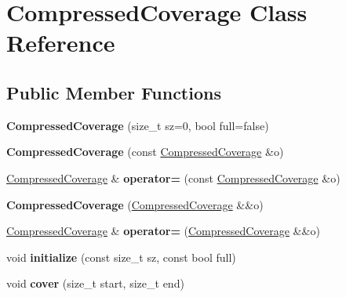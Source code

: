 \hypertarget{classCompressedCoverage}{}\section{Compressed\+Coverage Class Reference}
\label{classCompressedCoverage}
\subsection*{Public Member Functions}
\begin{DoxyCompactItemize}
\item 
\mbox{\label{classCompressedCoverage_afecf6c8baa0069c95fd66ad0b768f536}} 
{\bfseries Compressed\+Coverage} (size\+\_\+t sz=0, bool full=false)
\item 
\mbox{\label{classCompressedCoverage_afc3aafc52e7c0563995eab394e62b876}} 
{\bfseries Compressed\+Coverage} (const \hyperlink{classCompressedCoverage}{Compressed\+Coverage} \&o)
\item 
\mbox{\label{classCompressedCoverage_a6c06a049a069676dcb6a17662ec73bc7}} 
\hyperlink{classCompressedCoverage}{Compressed\+Coverage} \& {\bfseries operator=} (const \hyperlink{classCompressedCoverage}{Compressed\+Coverage} \&o)
\item 
\mbox{\label{classCompressedCoverage_ac91a83632f8c01ce949182532b38093f}} 
{\bfseries Compressed\+Coverage} (\hyperlink{classCompressedCoverage}{Compressed\+Coverage} \&\&o)
\item 
\mbox{\label{classCompressedCoverage_ab4e6bd2cefd62d415fc7ce65010d0830}} 
\hyperlink{classCompressedCoverage}{Compressed\+Coverage} \& {\bfseries operator=} (\hyperlink{classCompressedCoverage}{Compressed\+Coverage} \&\&o)
\item 
\mbox{\label{classCompressedCoverage_ab91db25bdcd5994fa2f5acef3befa987}} 
void {\bfseries initialize} (const size\+\_\+t sz, const bool full)
\item 
\mbox{\label{classCompressedCoverage_a549339c6400a2cab45fa3cbb28dc5553}} 
void {\bfseries cover} (size\+\_\+t start, size\+\_\+t end)

\end{DoxyCompactItemize}

